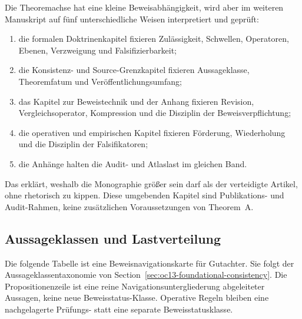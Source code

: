 Die Theoremachse hat eine kleine Beweisabhängigkeit, wird aber im weiteren Manuskript auf fünf unterschiedliche
Weisen interpretiert und geprüft:

\begin{enumerate}
\item die formalen Doktrinenkapitel fixieren Zulässigkeit, Schwellen, Operatoren, Ebenen, Verzweigung und Falsifizierbarkeit;
\item die Konsistenz- und Source-Grenzkapitel fixieren Aussageklasse, Theoremfatum und Veröffentlichungsumfang;
\item das Kapitel zur Beweistechnik und der Anhang fixieren Revision, Vergleichsoperator, Kompression und die Disziplin der Beweisverpflichtung;
\item die operativen und empirischen Kapitel fixieren Förderung, Wiederholung und die Disziplin der Falsifikatoren;
\item die Anhänge halten die Audit- und Atlaslast im gleichen Band.
\end{enumerate}

Das erklärt, weshalb die Monographie größer sein darf als der verteidigte Artikel, ohne rhetorisch zu kippen.
Diese umgebenden Kapitel sind Publikations- und Audit-Rahmen, keine zusätzlichen Voraussetzungen von Theorem~A.

\subsection{Aussageklassen und Lastverteilung}

Die folgende Tabelle ist eine Beweisnavigationskarte für Gutachter. Sie folgt der Aussageklassentaxonomie
von Section~\ref{sec:oc13-foundational-consistency}. Die Propositionenzeile ist eine reine
Navigationsuntergliederung abgeleiteter Aussagen, keine neue Beweisstatus-Klasse. Operative Regeln bleiben
eine nachgelagerte Prüfungs- statt eine separate Beweisstatusklasse.

